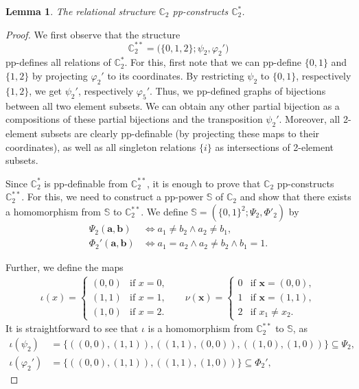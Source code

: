 \documentclass[12pt]{amsart}
\newtheorem{lemma}[theorem]{Lemma}
\theoremstyle{definition}
\theoremstyle{definition}
\newcommand{\struct}[1]{\mathbb{#1}}
\begin{document}
\begin{lemma}\label{lem:C2Collapse}
The relational structure $\struct{C}_2$ pp-constructs $\struct{C}^{*}_2$.
\end{lemma}
\begin{proof}

We first observe that the structure
$$\struct{C}^{**}_2 = \Big(\{0,1,2\};\psi_2,\varphi_2'\Big)$$
pp-defines all relations of $\struct{C}^{*}_2$. For this, first note that we can pp-define $\{0,1\}$ and $\{1,2\}$ by projecting $\varphi_2'$ to its coordinates. By restricting $\psi_2$ to $\{0,1\}$, respectively $\{1,2\}$, we get $\psi_2'$, respectively $\varphi_5'$. Thus, we pp-defined graphs of bijections between all two element subsets. We can obtain any other partial bijection as a compositions of these partial bijections and the transposition $\psi_2'$. Moreover, all 2-element subsets are clearly pp-definable (by projecting these maps to their coordinates), as well as all singleton relations $\{i\}$ as intersections of 2-element subsets.

Since $\struct{C}^{*}_2$ is pp-definable from $\struct{C}^{**}_2$, it is enough to prove that $\struct{C}_2$ pp-constructs $\struct{C}^{**}_2$. For this, we need to construct a pp-power $\struct{S}$ of $\struct{C}_2$ and show that there exists a homomorphism from $\struct{S}$ to $\struct{C}^{**}_2$.  We define $\struct{S} = (\{0,1\}^2;\Psi_2,\Phi'_2)$ by
\begin{align*}
\Psi_2(\boldsymbol{a},\boldsymbol{b}) &\Leftrightarrow a_1 \neq b_2 \wedge a_2 \neq b_1,\\
\Phi_2'(\boldsymbol{a},\boldsymbol{b}) &\Leftrightarrow a_1=a_2\land a_2\neq b_2\land b_1=1.
\end{align*}

Further, we define the maps
\begin{align*}\label{equation:mappahom1}
 \iota(x)=\begin{cases}
   (0,0) & \text{if } x = 0,\\
   (1,1) & \text{if } x = 1,\\
   (1,0) & \text{if } x = 2.
   \end{cases}
 &&\nu(\boldsymbol{x})=\begin{cases}
   0 & \text{if } \boldsymbol{x} = (0,0),\\
   1 & \text{if } \boldsymbol{x} = (1,1),\\
   2 & \text{if } x_1 \neq x_2.
   \end{cases}
\end{align*}
It is straightforward to see that $\iota$ is a homomorphism from $\struct{C}^{**}_2$ to $\struct{S}$, as 
\begin{align*}
\iota(\psi_2) &= \{ ((0,0),(1,1)), ((1,1),(0,0)), ((1,0),(1,0))  \} \subseteq \Psi_2,\\
\iota(\varphi_2') &= \{ ((0,0),(1,1)), ((1,1),(1,0))  \} \subseteq \Phi_2',
\end{align*}


\end{proof}
\end{document}
